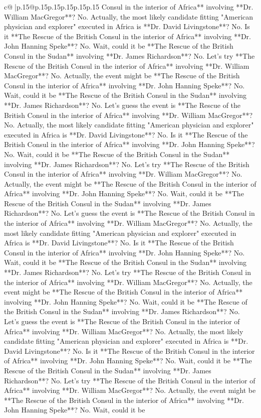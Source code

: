\documentclass{article}
\begin{document}
{\begin{supertabular}{c@{$\;$}|p{.15\linewidth}@{}p{.15\linewidth}p{.15\linewidth}p{.15\linewidth}p{.15\linewidth}p{.15\linewidth}}
{{{Consul in the interior of Africa** involving **Dr. William MacGregor**? No. Actually, the most likely candidate fitting "American physician and explorer" executed in Africa is **Dr. David Livingstone**? No. Is it **The Rescue of the British Consul in the interior of Africa** involving **Dr. John Hanning Speke**? No. Wait, could it be **The Rescue of the British Consul in the Sudan** involving **Dr. James Richardson**? No. Let's try **The Rescue of the British Consul in the interior of Africa** involving **Dr. William MacGregor**? No. Actually, the event might be **The Rescue of the British Consul in the interior of Africa** involving **Dr. John Hanning Speke**? No. Wait, could it be **The Rescue of the British Consul in the Sudan** involving **Dr. James Richardson**? No. Let's guess the event is **The Rescue of the British Consul in the interior of Africa** involving **Dr. William MacGregor**? No. Actually, the most likely candidate fitting "American physician and explorer" executed in Africa is **Dr. David Livingstone**? No. Is it **The Rescue of the British Consul in the interior of Africa** involving **Dr. John Hanning Speke**? No. Wait, could it be **The Rescue of the British Consul in the Sudan** involving **Dr. James Richardson**? No. Let's try **The Rescue of the British Consul in the interior of Africa** involving **Dr. William MacGregor**? No. Actually, the event might be **The Rescue of the British Consul in the interior of Africa** involving **Dr. John Hanning Speke**? No. Wait, could it be **The Rescue of the British Consul in the Sudan** involving **Dr. James Richardson**? No. Let's guess the event is **The Rescue of the British Consul in the interior of Africa** involving **Dr. William MacGregor**? No. Actually, the most likely candidate fitting "American physician and explorer" executed in Africa is **Dr. David Livingstone**? No. Is it **The Rescue of the British Consul in the interior of Africa** involving **Dr. John Hanning Speke**? No. Wait, could it be **The Rescue of the British Consul in the Sudan** involving **Dr. James Richardson**? No. Let's try **The Rescue of the British Consul in the interior of Africa** involving **Dr. William MacGregor**? No. Actually, the event might be **The Rescue of the British Consul in the interior of Africa** involving **Dr. John Hanning Speke**? No. Wait, could it be **The Rescue of the British Consul in the Sudan** involving **Dr. James Richardson**? No. Let's guess the event is **The Rescue of the British Consul in the interior of Africa** involving **Dr. William MacGregor**? No. Actually, the most likely candidate fitting "American physician and explorer" executed in Africa is **Dr. David Livingstone**? No. Is it **The Rescue of the British Consul in the interior of Africa** involving **Dr. John Hanning Speke**? No. Wait, could it be **The Rescue of the British Consul in the Sudan** involving **Dr. James Richardson**? No. Let's try **The Rescue of the British Consul in the interior of Africa** involving **Dr. William MacGregor**? No. Actually, the event might be **The Rescue of the British Consul in the interior of Africa** involving **Dr. John Hanning Speke**? No. Wait, could it be }}}
\end{supertabular}}
\end{document}
